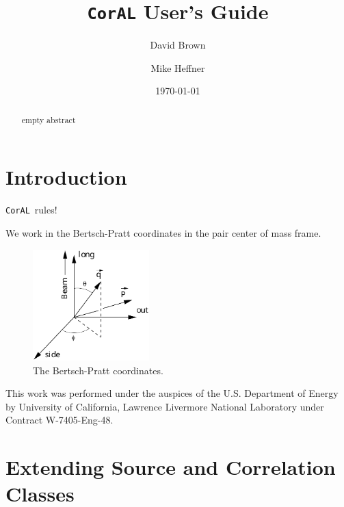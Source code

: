 \documentclass[aps,prc,twocolumn,floatfix,preprintnumbers]{revtex4}
\newcommand{\coral}{{\tt CorAL}}
\begin{document}
\title{{\tt CorAL} User's Guide}


\author{David Brown}
\author{Mike Heffner}

\date{\today}

\begin{abstract}
empty abstract
\end{abstract}

\maketitle
   
\section{Introduction}
\coral\, rules!

We work in the Bertsch-Pratt coordinates in the pair center of mass frame.

\begin{figure}
\includegraphics[width=0.4\textwidth]{coords}
\caption{The Bertsch-Pratt coordinates.}
\label{coords}
\end{figure}











\acknowledgments
This work was performed under the auspices of the U.S. Department of Energy by University of California, Lawrence Livermore National Laboratory under Contract W-7405-Eng-48.

\appendix
\section{Extending Source and Correlation Classes}
\end{document}
